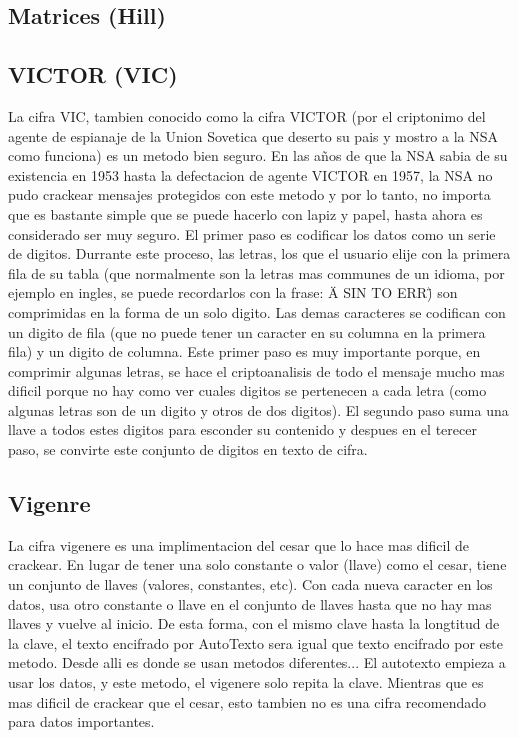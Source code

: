 \documentclass{article}
\begin{document}
		\subsection{Matrices (Hill)}
		\subsection{VICTOR (VIC)}
			La cifra VIC, tambien conocido como la cifra VICTOR (por el criptonimo del agente de espianaje de la Union Sovetica que deserto su pais y mostro a la NSA como funciona) es un metodo bien seguro. En las años de que la NSA sabia de su existencia en 1953 hasta la defectacion de agente VICTOR en 1957, la NSA no pudo crackear mensajes protegidos con este metodo y por lo tanto, no importa que es bastante simple que se puede hacerlo con lapiz y papel, hasta ahora es considerado ser muy seguro. El primer paso es codificar los datos como un serie de digitos. Durrante este proceso, las letras, los que el usuario elije con la primera fila de su tabla (que normalmente son la letras mas communes de un idioma, por ejemplo en ingles, se puede recordarlos con la frase: \"A SIN TO ERR\") son comprimidas en la forma de un solo digito. Las demas caracteres se codifican con un digito de fila (que no puede tener un caracter en su columna en la primera fila) y un digito de columna. Este primer paso es muy importante porque, en comprimir algunas letras, se hace el criptoanalisis de todo el mensaje mucho mas dificil porque no hay como ver cuales digitos se pertenecen a cada letra (como algunas letras son de un digito y otros de dos digitos). El segundo paso suma una llave a todos estes digitos para esconder su contenido y despues en el terecer paso, se convirte este conjunto de digitos en texto de cifra.
		\subsection{Vigenre}
			La cifra vigenere es una implimentacion del cesar que lo hace mas dificil de crackear. En lugar de tener una solo constante o valor (llave) como el cesar, tiene un conjunto de llaves (valores, constantes, etc). Con cada nueva caracter en los datos, usa otro constante o llave en el conjunto de llaves hasta que no hay mas llaves y vuelve al inicio. De esta forma, con el mismo clave hasta la longtitud de la clave, el texto encifrado por AutoTexto sera igual que texto encifrado por este metodo. Desde alli es donde se usan metodos diferentes... El autotexto empieza a usar los datos, y este metodo, el vigenere solo repita la clave. Mientras que es mas dificil de crackear que el cesar, esto tambien no es una cifra recomendado para datos importantes.
\end{document}
